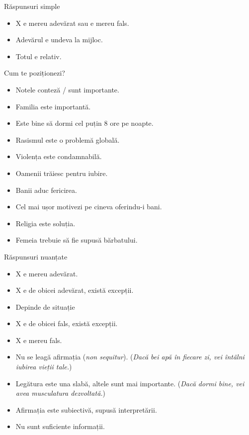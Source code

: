 \documentclass{simple}
\begin{document}
\begin{frame}{Răspunsuri simple}
  \begin{itemize}
    \pause
    \item X e mereu adevărat sau e mereu fals.
    \pause
    \item Adevărul e undeva la mijloc.
    \pause
    \item Totul e relativ.
  \end{itemize}
\end{frame}

\begin{frame}{Cum te poziționezi?}
  \begin{itemize}
    \pause
    \item Notele conteză / sunt importante.
    \pause
    \item Familia este importantă.
    \pause
    \item Este bine să dormi cel puțin 8 ore pe noapte.
    \pause
    \item Rasismul este o problemă globală.
    \pause
    \item Violența este condamnabilă.
    \pause
    \item Oamenii trăiesc pentru iubire.
    \pause
    \item Banii aduc fericirea.
    \pause
    \item Cel mai ușor motivezi pe cineva oferindu-i bani.
    \pause
    \item Religia este soluția.
    \pause
    \item Femeia trebuie să fie supusă bărbatului.
  \end{itemize}
\end{frame}

\begin{frame}{Răspunsuri nuanțate}
  \begin{itemize}
    \pause
    \item X e mereu adevărat.
    \pause
    \item X e de obicei adevărat, există excepții.
    \pause
    \item Depinde de situație
    \pause
    \item X e de obicei fals, există excepții.
    \pause
    \item X e mereu fals.
    \pause
    \item Nu se leagă afirmația (\textit{non sequitur}). (\textit{Dacă bei apă în fiecare zi, vei întâlni iubirea vieții tale.})
    \pause
    \item Legătura este una slabă, altele sunt mai importante. (\textit{Dacă dormi bine, vei avea musculatura dezvoltată.})
    \pause
    \item Afirmația este subiectivă, supusă interpretării.
    \pause
    \item Nu sunt suficiente informații.
  \end{itemize}
\end{frame}
\end{document}
